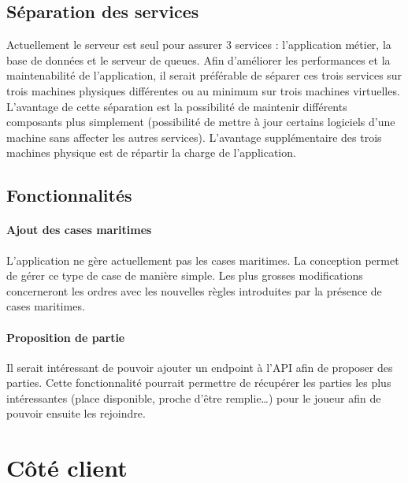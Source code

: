 

	\subsection{Séparation des services} %
	\label{sub:separation_des_services}

		Actuellement le serveur est seul pour assurer 3 services : l'application métier, la base de données et le serveur de queues. Afin d'améliorer les performances et la maintenabilité de l'application, il serait préférable de séparer ces trois services sur trois machines physiques différentes ou au minimum sur trois machines virtuelles. L'avantage de cette séparation est la possibilité de maintenir différents composants plus simplement (possibilité de mettre à jour certains logiciels d'une machine sans affecter les autres services). L'avantage supplémentaire des trois machines physique est de répartir la charge de l'application.


	\subsection{Fonctionnalités} %
	\label{sub:fonctionnalites}

		\paragraph{Ajout des cases maritimes} %
		\label{par:ajout_des_cases_maritimes}
			L'application ne gère actuellement pas les cases maritimes. La conception permet de gérer ce type de case de manière simple. Les plus grosses modifications concerneront les ordres avec les nouvelles règles introduites par la présence de cases maritimes.

		\paragraph{Proposition de partie} %
		\label{par:proposition_de_partie}
			Il serait intéressant de pouvoir ajouter un endpoint à l'API afin de proposer des parties. Cette fonctionnalité pourrait permettre de récupérer les parties les plus intéressantes (place disponible, proche d'être remplie\dots) pour le joueur afin de pouvoir ensuite les rejoindre.


\section{Côté client}
